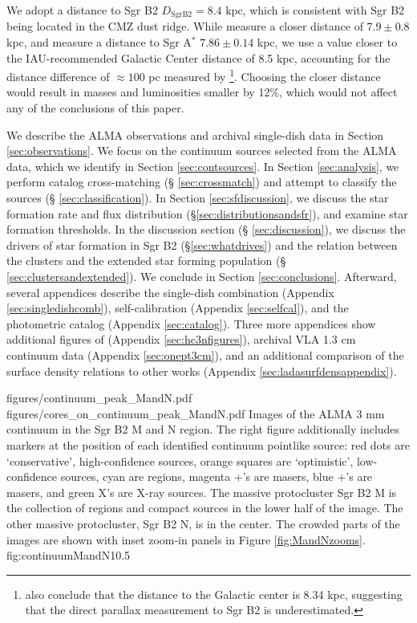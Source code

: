 \documentclass[twocolumn]{aastex61}
\newcommand{\dsgrb}{\ensuremath{8.4\textrm{~kpc}}\xspace}
\begin{document}
We adopt a distance to Sgr B2 $D_{\mathrm{Sgr B2}}=\dsgrb$, which is consistent
with Sgr B2 being located in the CMZ dust ridge.  While \citet{Reid2009a}
measure a closer distance of $7.9\pm0.8$ kpc, and \citet{Boehle2016a}
measure a distance to Sgr A$^*$ $7.86\pm0.14$ kpc, we use a value closer to the
IAU-recommended Galactic Center distance of 8.5 kpc, accounting for the
distance difference of $\approx100$ pc measured by
\citet{Reid2009a}\footnote{\citet{Reid2014a} also conclude that the distance to
the Galactic center is 8.34 kpc, suggesting that the direct parallax
measurement to Sgr B2 is underestimated.}.  Choosing the closer distance would
result in masses and luminosities smaller by 12\%, which would not affect any
of the conclusions of this paper.

We describe the ALMA observations and archival single-dish data in Section
\ref{sec:observations}. We focus on the continuum sources selected from the
ALMA data, which we identify in Section \ref{sec:contsources}.  In Section
\ref{sec:analysis}, we perform catalog cross-matching (\S
\ref{sec:crossmatch}) and attempt to classify the sources (\S
\ref{sec:classification}).  In Section \ref{sec:sfdiscussion}, we discuss the
star formation rate and flux distribution (\S \ref{sec:distributionsandsfr}),
and examine star formation thresholds.  In the discussion section (\S
\ref{sec:discussion}), we discuss
the drivers of star formation in Sgr B2 (\S \ref{sec:whatdrives}) and the
relation between the clusters and the extended star forming population (\S
\ref{sec:clustersandextended}).  We conclude in Section \ref{sec:conclusions}.
Afterward, several appendices describe the single-dish combination (Appendix
\ref{sec:singledishcomb}), self-calibration (Appendix \ref{sec:selfcal}), and
the photometric catalog (Appendix \ref{sec:catalog}).  Three more appendices show
additional figures of \cyanoacetylene (Appendix \ref{sec:hc3nfigures}), 
archival VLA 1.3 cm continuum data (Appendix \ref{sec:onept3cm}), and an
additional comparison of the surface density relations to other works (Appendix
\ref{sec:ladasurfdensappendix}).


\FigureTwo
{figures/continuum_peak_MandN.pdf}
{figures/cores_on_continuum_peak_MandN.pdf}
{Images of the ALMA 3 mm continuum in the Sgr B2 M and N region.  The right
figure additionally includes markers at the position of each identified
continuum pointlike source: red dots are `conservative', high-confidence
sources, orange squares are `optimistic', low-confidence sources, cyan are \hii
regions, magenta +'s are \methanol masers, blue +'s are \water masers, and
green X's are X-ray sources.  The massive
protocluster Sgr B2 M is the collection of \hii regions and compact sources in
the lower half of the image.  The other massive protocluster, Sgr B2 N, is in
the center.
The crowded parts of the images are shown with inset zoom-in panels in
Figure \ref{fig:MandNzooms}.
}
{fig:continuumMandN}{1}{0.5\textwidth}
\end{document}
